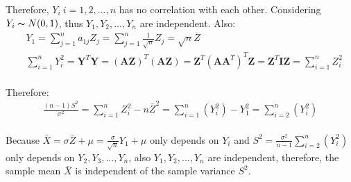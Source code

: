\documentclass[twoside]{homework}
\begin{document}
Therefore, $Y_i\ i=1,2,...,n$ has no correlation with each other. Considering $Y_i \thicksim N(0,1)$, thus $Y_1, Y_2,..., Y_n$ are independent. 
Also:\\
\begin{equation}
\begin{aligned}
&Y_1 = \sum_{j=1}^{n} a_{1j}Z_j = \sum_{j=1}^{n}\frac{1}{\sqrt{n}}Z_j = \sqrt{n}\bar{Z}\\
&\sum_{i=1}^{n}Y_i^2 = \bm{Y}^T\bm{Y} = (\bm{AZ})^T(\bm{AZ}) = \bm{Z}^T (\bm{A} \bm{A}^T)^T \bm{Z} = \bm{Z}^T \bm{I} \bm{Z} = \sum_{i=1}^{n}Z_i^2
\end{aligned}
\end{equation}\\
Therefore:
\begin{equation}
\begin{aligned}
\frac{(n-1)S^2}{\sigma^2} = \sum_{i=1}^{n}Z_i^2 - n\bar{Z}^2 = \sum_{i=1}^{n}(Y_i^2) - Y_1^2 = \sum_{i=2}^{n}(Y_i^2)
\end{aligned}
\end{equation}\\
Because $\bar{X} = \sigma \bar{Z} + \mu = \frac{\sigma}{\sqrt{n}}Y_1 + \mu$ only depends on $Y_i$ and $S^2 = \frac{\sigma^2}{n-1} \sum_{i=2}^{n}(Y_i^2)$ only depends on $Y_2, Y_3,...,Y_n$, also $Y_1, Y_2,..., Y_n$ are independent, therefore, the sample mean $\bar{X}$ is independent of the sample variance $S^2$. 


\newpage
\end{document}

